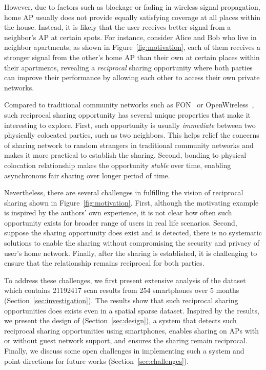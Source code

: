 However, due to factors such as blockage or fading in wireless signal
propagation, home \wifi{} AP usually does not provide equally satisfying \wifi{}
coverage at all places within the house. Instead, it is likely that the user
receives better \wifi{} signal from a neighbor's AP at certain spots. For
instance, consider Alice and Bob who live in neighbor apartments, as shown in
Figure~\ref{fig:motivation}, each of them receives a stronger \wifi{} signal
from the other's home AP than their own at certain places within their
apartments, revealing a \textit{reciprocal} \wifi{} sharing opportunity where
both parties can improve their \wifi{} performance by allowing each other to
access their own private networks.

Compared to traditional community networks such as FON~\cite{fon} or
OpenWireless~\cite{openwireless}, such reciprocal sharing opportunity has
several unique properties that make it interesting to explore. First, such
opportunity is usually \textit{immediate} between two physically colocated
parties, such as two neighbors. This helps relief the concerns of sharing
network to random strangers in traditional community networks and makes it more
practical to establish the sharing. Second, bonding to physical colocation
relationship makes the opportunity \textit{stable} over time, enabling
asynchronous fair sharing over longer period of time.


Nevertheless, there are several challenges in fulfilling the vision of
reciprocal \wifi{} sharing shown in Figure~\ref{fig:motivation}. First, although
the motivating example is inspired by the authors' own experience, it is not
clear how often such opportunity exists for broader range of users in real life
scenarios. Second, suppose the sharing opportunity does exist and is detected,
there is no systematic solutions to enable the \wifi{} sharing without
compromising the security and privacy of user's home network. Finally, after the
\wifi{} sharing is established, it is challenging to ensure that the
relationship remains reciprocal for both parties.

To address these challenges, we first present extensive analysis of the
\PhoneLab{} \wifi{} dataset which contains \num{21192417} scan results from 254
smartphones over 5 months (Section~\ref{sec:investigation}). The results show
that such reciprocal \wifi{} sharing opportunities does exists even in a spatial
sparse dataset. Inspired by the results, we present the design of \wisefi{}
(Section~\ref{sec:design}), a system that detects such reciprocal \wifi{}
sharing opportunities using smartphones, enables \wifi{} sharing on APs with or
without guest network support, and ensures the sharing remain reciprocal.
Finally, we discuss some open challenges in implementing such a system and point
directions for future works (Section~\ref{sec:challenges}).

